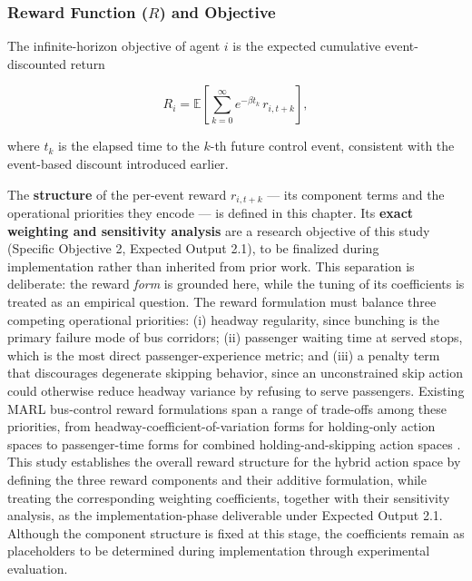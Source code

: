\subsubsection{Reward Function ($R$) and Objective}
\label{subsec:reward}

The infinite-horizon objective of agent $i$ is the expected cumulative event-discounted return

\begin{equation}
R_i = \mathbb{E}\!\left[\sum_{k=0}^{\infty} e^{-\beta t_k}\, r_{i, t+k}\right],
\end{equation}

where $t_k$ is the elapsed time to the $k$-th future control event, consistent with the event-based discount introduced earlier.

The \textbf{structure} of the per-event reward $r_{i, t+k}$ --- its component terms and the operational priorities they encode --- is defined in this chapter. Its \textbf{exact weighting and sensitivity analysis} are a research objective of this study (Specific Objective 2, Expected Output 2.1), to be finalized during implementation rather than inherited from prior work. This separation is deliberate: the reward \textit{form} is grounded here, while the tuning of its coefficients is treated as an empirical question. The reward formulation must balance three competing operational priorities: (i) headway regularity, since bunching is the primary failure mode of bus corridors; (ii) passenger waiting time at served stops, which is the most direct passenger-experience metric; and (iii) a penalty term that discourages degenerate skipping behavior, since an unconstrained skip action could otherwise reduce headway variance by refusing to serve passengers. Existing MARL bus-control reward formulations span a range of trade-offs among these priorities, from headway-coefficient-of-variation forms for holding-only action spaces \cite{Wangsun,Wang2023MultiObj} to passenger-time forms for combined holding-and-skipping action spaces \cite{Rodriguez2023Cooperative}. This study establishes the overall reward structure for the hybrid action space by defining the three reward components and their additive formulation, while treating the corresponding weighting coefficients, together with their sensitivity analysis, as the implementation-phase deliverable under Expected Output 2.1. Although the component structure is fixed at this stage, the coefficients remain as placeholders to be determined during implementation through experimental evaluation.

